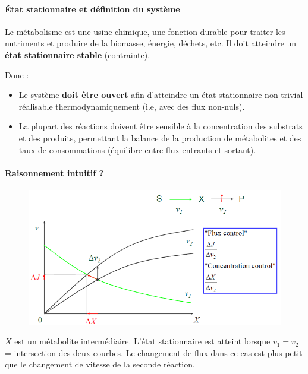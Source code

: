 \paragraph{État stationnaire et définition du système}
Le métabolisme est une usine chimique, une fonction durable pour traiter les nutriments et produire de la biomasse, énergie, déchets, etc. Il doit atteindre un \textbf{état stationnaire stable} (contrainte).

Donc :
\begin{itemize}
	\item Le système \textbf{doit être ouvert} afin d'atteindre un état stationnaire non-trivial réalisable thermodynamiquement (i.e, avec des flux non-nuls).
	\item La plupart des réactions doivent être sensible à la concentration des substrats et des produits, permettant la balance de la production de métabolites et des taux de consommations (équilibre entre flux entrants et sortant).   	
\end{itemize}


\paragraph{Raisonnement intuitif ?}
\begin{figure}
	\centering
	\includegraphics{Images/02_1.PNG}
\end{figure}
$X$ est un métabolite intermédiaire. L'état stationnaire est atteint  lorsque $v_1 = v_2$ = intersection des deux courbes. 
Le changement de flux dans ce cas est plus petit que le changement de vitesse de la seconde réaction. 


